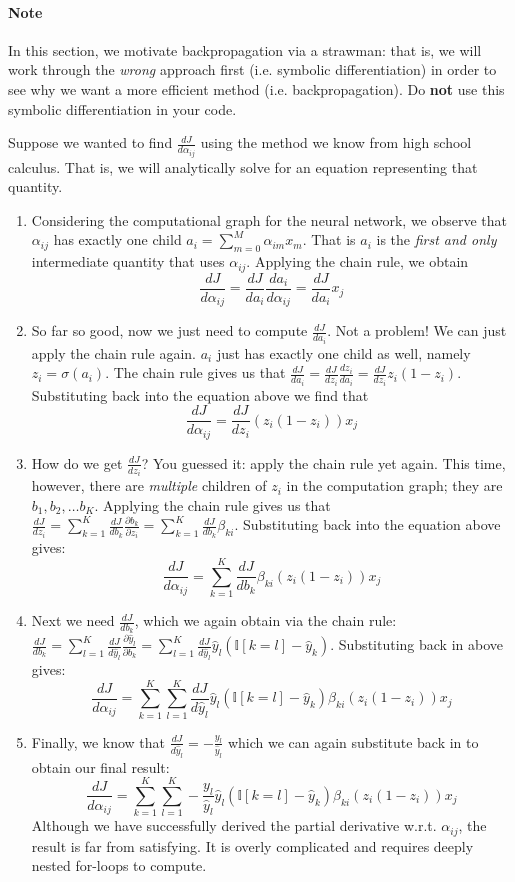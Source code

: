 \documentclass[11pt,addpoints,answers]{exam}
\newcommand{\adj}[1]{\frac{d J}{d #1}}
\newcommand{\chain}[2]{\adj{#2} = \adj{#1}\frac{d #1}{d #2}}
\newcommand{\Ib}{\mathbb{I}}
\begin{document}
\begin{notebox}
\paragraph{Note} In this section, we motivate backpropagation via a strawman: that is, we will work through the \emph{wrong} approach first (i.e. symbolic differentiation) in order to see why we want a more efficient method (i.e. backpropagation). Do {\bf not} use this symbolic differentiation in your code.
\end{notebox}

Suppose we wanted to find $\adj{\alpha_{ij}}$ using the method we know from high school calculus. That is, we will analytically solve for an equation representing that quantity.

\begin{enumerate}
    \item Considering the computational graph for the neural network, we observe that $\alpha_{ij}$ has exactly one child $a_i = \sum_{m=0}^M \alpha_{im} x_m$. That is $a_i$ is the \emph{first and only} intermediate quantity that uses $\alpha_{ij}$. Applying the chain rule, we obtain 
        \[ \chain{a_i}{\alpha_{ij}} = \adj{a_i} x_j \] 
    \item So far so good, now we just need to compute $\adj{a_i}$. Not a problem! We can just apply the chain rule again. $a_i$ just has exactly one child as well, namely $z_i = \sigma(a_i)$. The chain rule gives us that $\chain{z_i}{a_i} = \adj{z_i} z_i (1 - z_i)$. Substituting back into the equation above we find that 
        \[ \adj{\alpha_{ij}} = \adj{z_i} (z_i (1-z_i)) x_j \]
    \item How do we get $\adj{z_i}$? You guessed it: apply the chain rule yet again. This time, however, there are \emph{multiple} children of $z_i$ in the computation graph; they are $b_1, b_2, \ldots b_K$. Applying the chain rule gives us that $\adj{z_i} = \sum_{k=1}^K \adj{b_k}\frac{\partial  b_k}{\partial  z_i} = \sum_{k=1}^K \adj{b_k}\beta_{ki}$. Substituting back into the equation above gives:
        \[ \adj{\alpha_{ij}} = \sum_{k=1}^K \adj{b_k}\beta_{ki} (z_i (1-z_i)) x_j \]
    \item Next we need $\adj{b_k}$, which we again obtain via the chain rule: $\adj{b_k} = \sum_{l=1}^K \adj{\hat{y}_l} \frac{\partial  \hat{y}_l}{\partial  b_k} = \sum_{l=1}^K \adj{\hat{y}_l} \hat{y}_l (\Ib[k=l] - \hat{y}_k)$. Substituting back in above gives:
        \[ \adj{\alpha_{ij}} = \sum_{k=1}^K \sum_{l=1}^K \adj{\hat{y}_l} \hat{y}_l (\Ib[k=l] - \hat{y}_k) \beta_{ki} (z_i (1-z_i)) x_j \]
    \item Finally, we know that $\adj{\hat{y}_l} = - \frac{y_l}{\hat{y}_l}$ which we can again substitute back in to obtain our final result:
        \[ \adj{\alpha_{ij}} = \sum_{k=1}^K \sum_{l=1}^K - \frac{y_l}{\hat{y}_l} \hat{y}_l (\Ib[k=l] - \hat{y}_k) \beta_{ki} (z_i (1-z_i)) x_j \]
    Although we have successfully derived the partial derivative w.r.t. $\alpha_{ij}$, the result is far from satisfying. It is overly complicated and requires deeply nested for-loops to compute.
\end{enumerate}
\end{document}
